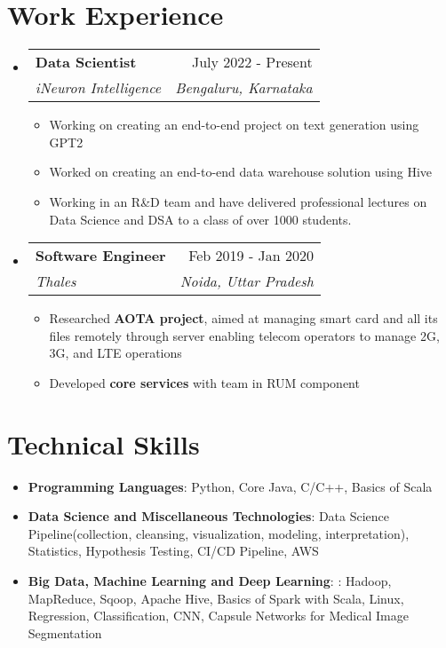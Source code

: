 \documentclass[letterpaper,11pt]{article}
\makeatletter
\newcommand{\resumeItem}[1]{
  \item\small{
    {#1 \vspace{-2pt}}
  }
}
\newcommand{\resumeSubheading}[4]{
  \vspace{-2pt}\item
    \begin{tabular*}{0.97\textwidth}[t]{l@{\extracolsep{\fill}}r}
      \textbf{#1} & #2 \\
      \textit{\small#3} & \textit{\small #4} \\
    \end{tabular*}\vspace{-7pt}
}
\newcommand{\resumeSubSubheading}[2]{
    \item
    \begin{tabular*}{0.97\textwidth}{l@{\extracolsep{\fill}}r}
      \textit{\small#1} & \textit{\small #2} \\
    \end{tabular*}\vspace{-7pt}
}
\newcommand{\resumeSubHeadingListStart}{\begin{itemize}[leftmargin=0.15in, label={}]}
\newcommand{\resumeSubHeadingListEnd}{\end{itemize}}
\newcommand{\resumeItemListStart}{\begin{itemize}}
\newcommand{\resumeItemListEnd}{\end{itemize}\vspace{-5pt}}
\makeatother
\begin{document}
\section{Work Experience}
  \resumeSubHeadingListStart
  \resumeSubheading
      {Data Scientist}{July 2022 - Present}
      {iNeuron Intelligence}{Bengaluru, Karnataka}
      \resumeItemListStart
       \resumeItem{Working on creating an end-to-end project on text generation using GPT2}
        \resumeItem{Worked on creating an end-to-end data warehouse solution using Hive}
         \resumeItem{Working in an R\&D team and have delivered professional lectures on Data Science and DSA to a class of over 1000 students.}
    \resumeItemListEnd
    \resumeSubheading
      {Software Engineer}{Feb 2019 - Jan 2020}
      {Thales}{Noida, Uttar Pradesh}
      \resumeItemListStart
        \resumeItem{Researched \textbf{AOTA project}, aimed at managing smart card and all its files remotely through server enabling telecom operators to manage 2G, 3G, and LTE operations}
        \resumeItem{Developed \textbf{core services} with team in RUM component}
    \resumeItemListEnd
  \resumeSubHeadingListEnd


%
\section{Technical Skills}
\resumeItemListStart
            \resumeItem{\textbf{Programming Languages}{: Python, Core Java, C/C++, Basics of Scala}}
            \resumeItem{\textbf{Data Science and Miscellaneous Technologies}{: Data Science Pipeline(collection, cleansing, visualization, modeling, interpretation), Statistics, Hypothesis Testing, CI/CD Pipeline, AWS}}
            \resumeItem{\textbf{Big Data, Machine Learning and Deep Learning}{: : Hadoop, MapReduce, Sqoop, Apache Hive, Basics of Spark with Scala, Linux, Regression, Classification, CNN, Capsule Networks for Medical Image Segmentation}}
\resumeItemListEnd
\end{document}
